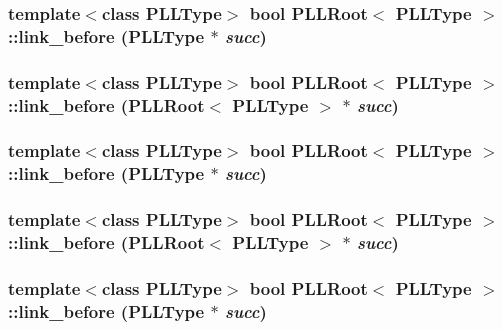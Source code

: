 \subsubsection{\setlength{\rightskip}{0pt plus 5cm}template$<$class PLLType$>$ bool PLLRoot$<$ {\bf PLLType} $>$::link\_\-before ({\bf PLLType} $\ast$ {\em succ})\hspace{0.3cm}{\tt  [inline]}}\label{classPLLRoot_a60}


\subsubsection{\setlength{\rightskip}{0pt plus 5cm}template$<$class PLLType$>$ bool PLLRoot$<$ {\bf PLLType} $>$::link\_\-before (PLLRoot$<$ {\bf PLLType} $>$ $\ast$ {\em succ})\hspace{0.3cm}{\tt  [inline]}}\label{classPLLRoot_a59}


\subsubsection{\setlength{\rightskip}{0pt plus 5cm}template$<$class PLLType$>$ bool PLLRoot$<$ {\bf PLLType} $>$::link\_\-before ({\bf PLLType} $\ast$ {\em succ})\hspace{0.3cm}{\tt  [inline]}}\label{classPLLRoot_a43}


\subsubsection{\setlength{\rightskip}{0pt plus 5cm}template$<$class PLLType$>$ bool PLLRoot$<$ {\bf PLLType} $>$::link\_\-before (PLLRoot$<$ {\bf PLLType} $>$ $\ast$ {\em succ})\hspace{0.3cm}{\tt  [inline]}}\label{classPLLRoot_a42}


\subsubsection{\setlength{\rightskip}{0pt plus 5cm}template$<$class PLLType$>$ bool PLLRoot$<$ {\bf PLLType} $>$::link\_\-before ({\bf PLLType} $\ast$ {\em succ})\hspace{0.3cm}{\tt  [inline]}}\label{classPLLRoot_a26}


